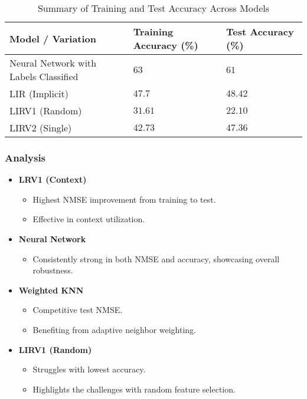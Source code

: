 \documentclass[a4paper, 12pt]{report}
\begin{document}
\begin{table}[H]
    \centering
    \caption{Summary of Training and Test Accuracy Across Models}
    \label{tab:summary_accuracy_all_models_accuracy_exp4}
    \small
    \begin{tabular}{|l|l|l|}
    \toprule
    \textbf{Model / Variation} & \textbf{Training Accuracy (\%)} & \textbf{Test Accuracy (\%)} \\
    \midrule
    Neural Network with Labels Classified & $63$ & $61$ \\
    LIR (Implicit) & $47.7$ & $48.42$ \\
    LIRV1 (Random) & $31.61$ & $22.10$ \\
    LIRV2 (Single) & $42.73$ & $47.36$ \\
    \bottomrule
    \end{tabular}
\end{table}
\clearpage

\subsubsection{Analysis}
\begin{itemize}
    \item \textbf{LRV1 (Context)}
    \begin{itemize}
        \item Highest NMSE improvement from training to test.
        \item Effective in context utilization.
    \end{itemize}
    
    \item \textbf{Neural Network}
    \begin{itemize}
        \item Consistently strong in both NMSE and accuracy, showcasing overall robustness.
    \end{itemize}
    
    \item \textbf{Weighted KNN}
    \begin{itemize}
        \item Competitive test NMSE.
        \item Benefiting from adaptive neighbor weighting.
    \end{itemize}

    \item \textbf{LIRV1 (Random)}
    \begin{itemize}
        \item Struggles with lowest accuracy.
        \item Highlights the challenges with random feature selection.
    \end{itemize}
\end{itemize}
\end{document}
